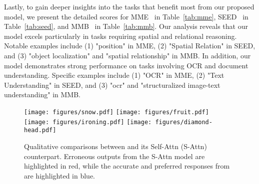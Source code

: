 





Lastly, to gain deeper insights into the tasks that benefit most from our proposed \method{} model, we present the detailed scores for MME~\citep{fu2024mmecomprehensiveevaluationbenchmark} in Table~\ref{tab:mme}, SEED~\citep{li2023seed} in Table~\ref{tab:seed}, and MMB~\citep{liu2023mmbench} in Table~\ref{tab:mmb}.
Our analysis reveals that our \method{} model excels particularly in tasks requiring spatial and relational reasoning.
Notable examples include (1) "position" in MME, (2) "Spatial Relation" in SEED, and (3) "object localization" and "spatial relationship" in MMB.
In addition, our \method{} model demonstrates strong performance on tasks involving OCR and document understanding.
Specific examples include (1) "OCR" in MME, (2) "Text Understanding" in SEED, and (3) "ocr" and "structuralized image-text understanding" in MMB.


\begin{figure}[t]
\centering
\texttt{[image: figures/snow.pdf]}
\texttt{[image: figures/fruit.pdf]}
\texttt{[image: figures/ironing.pdf]}
\texttt{[image: figures/diamond-head.pdf]}
\caption{
Qualitative comparisons between \method{} and its Self-Attn (S-Attn) counterpart. Erroneous outputs from the S-Attn model are highlighted in red, while the accurate and preferred responses from \method{} are highlighted in blue. 
}\label{fig:qualitative}
\end{figure}
